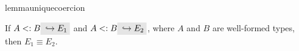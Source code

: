 \begin{restatable}{lemma}{uniquecoercion}
  \label{lemma:unique-coercion}

  If $A \subtype B \yields {E_1}$ and $A \subtype B \yields {E_2}$, where $A$
  and $B$ are well-formed types, then $E_1 \equiv E_2$.
\end{restatable}

\begin{comment}
\paragraph{No Loss of Expressiveness.}
Interestingly, our restrictions on subtyping do not sacrifice the expressiveness of
subtyping since we have the following two theorems:
\begin{theorem}
  If $A_1 \subtype A_3$, then $A_1 \inter A_2 \subtype A_3$.
\end{theorem}
\begin{theorem}
If $A_2 \subtype A_3$, then $A_1 \inter A_2 \subtype A_3$.
\end{theorem}

\noindent The interpretation of the two theorems is that: even though the
premise is made stricter by the atomic condition, we can still derive every
subtyping relation which is valid in the unrestricted system.


Throughout the paper we already presented an intuitive
definition for disjointness. 
We recall the definition of disjointness next.

\begin{definition}[Simple disjointness]\label{def:simple_dis}
  Two types $A$ and $B$ are disjoint
  (written $A \disjoint B$) if there is no type $C$ such that both $A$ and $B$ are
  subtypes of $C$:
  \[A \disjoint B \equiv \not\exists C.~A \subtype C~\text{and}~B \subtype C\]
\end{definition}

For example, $\code{Int}$ and $\code{Char}$ are disjoint,
since the two types do not have a common supertype. On the other hand, $\code{Int}$ is not
disjoint with itself, because $\code{Int} \subtype \code{Int}$. This implies that
disjointness is not reflexive as subtyping is. Two types with different ``shapes''
are always disjoint, unless one of them is an intersection type.
For example, a function type and an intersection
type may not be disjoint. Consider:
\[ \code{Int} \to \code{Int} \quad \text{and} \quad (\code{Int} \to \code{Int}) \inter (\code{String} \to \code{String}) \]
Those two types are not disjoint since $\code{Int} \to \code{Int}$ is their common supertype.
\end{comment}


